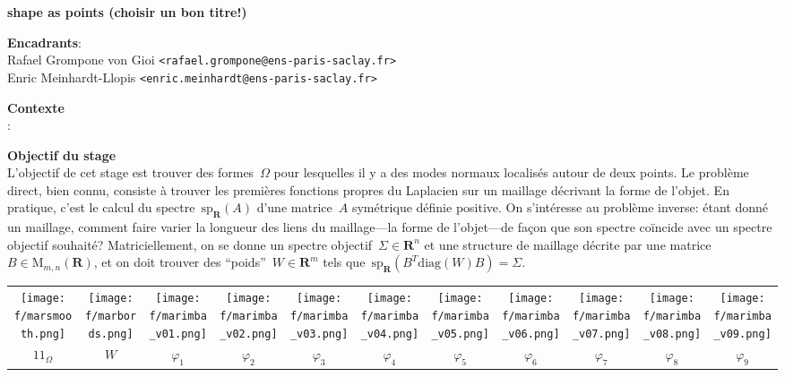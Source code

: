 \documentclass[a4paper,11pt]{article}
\begin{document}
\thispagestyle{empty}

{\bf
	shape as points (choisir un bon titre!)
}

{\bf Encadrants}:\\
Rafael Grompone von Gioi \verb+<rafael.grompone@ens-paris-saclay.fr>+\\
Enric Meinhardt-Llopis \verb+<enric.meinhardt@ens-paris-saclay.fr>+ 

{\bf Contexte}\\
:


{\bf Objectif du stage}\\
L'objectif de cet stage est trouver des formes~$\Omega$ pour lesquelles il y a
des modes normaux localisés autour de deux points.
Le problème direct, bien connu, consiste à trouver
les premières fonctions propres du Laplacien sur un maillage décrivant la forme
de l'objet.  En pratique, c'est le calcul du
spectre~$\mathrm{sp}_{\mathbf{R}}(A)$ d'une matrice~$A$ symétrique définie
positive.
On s'intéresse au problème inverse: étant donné un maillage, comment faire
varier la longueur des liens du maillage---la forme de l'objet---de façon que
son spectre coïncide avec un spectre objectif souhaité?
Matriciellement, on se donne un spectre
objectif~$\Sigma\in\mathbf{R}^n$ et une structure de maillage décrite par une
matrice~$B\in\mathrm{M}_{m,n}(\mathbf{R})$, et on doit trouver des
``poids''~$W\in\mathbf{R}^m$ tels
que~$\mathrm{sp}_\mathbf{R}\left(B^T\mathrm{diag}(W)B\right)=\Sigma$.

\setlength{\tabcolsep}{0pt}
\begin{tabular}{ccccccccccc}
	\texttt{[image: f/marsmooth.png]} &
	\texttt{[image: f/marbords.png]} &
	\texttt{[image: f/marimba\_v01.png]} &
	\texttt{[image: f/marimba\_v02.png]} &
	\texttt{[image: f/marimba\_v03.png]} &
	\texttt{[image: f/marimba\_v04.png]} &
	\texttt{[image: f/marimba\_v05.png]} &
	\texttt{[image: f/marimba\_v06.png]} &
	\texttt{[image: f/marimba\_v07.png]} &
	\texttt{[image: f/marimba\_v08.png]} &
	\texttt{[image: f/marimba\_v09.png]} \\
	$1\!\!1_\Omega$  & $W$ &
	$\varphi_1$ &
	$\varphi_2$ &
	$\varphi_3$ &
	$\varphi_4$ &
	$\varphi_5$ &
	$\varphi_6$ &
	$\varphi_7$ &
	$\varphi_8$ &
	$\varphi_9$
\end{tabular}
\end{document}
